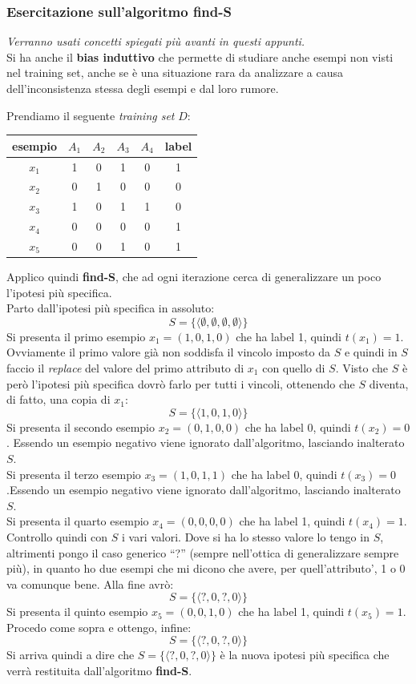 \documentclass[a4paper,12pt, oneside]{book}
\begin{document}
\subsubsection{Esercitazione sull'algoritmo find-S}
\textit{Verranno usati concetti spiegati più avanti in questi appunti.}\\
Si ha anche il \textbf{bias induttivo} che permette di studiare anche esempi non
visti nel training set, anche se è una situazione rara da analizzare a causa
dell'inconsistenza stessa degli esempi e dal loro rumore.
\begin{esempio}
  Prendiamo il seguente \textit{training set} $D$:
  \begin{table}[H]
    \centering
    \begin{tabular}[H]{c|cccc|c}
      esempio & $A_1$  & $A_2$  & $A_3$  & $A_4$ & label\\
      \hline
      $x_1$ & 1 & 0 & 1 & 0 & 1\\
      $x_2$ & 0 & 1 & 0 & 0 & 0\\
      $x_3$ & 1 & 0 & 1 & 1 & 0\\
      $x_4$ & 0 & 0 & 0 & 0 & 1\\
      $x_5$ & 0 & 0 & 1 & 0 & 1\\
    \end{tabular}
  \end{table}
  Applico quindi \textbf{find-S}, che ad ogni iterazione cerca di generalizzare
  un poco l'ipotesi più specifica.\\
  Parto dall'ipotesi più specifica in assoluto:
  \[S=\{\langle\emptyset,\emptyset,\emptyset,\emptyset\rangle\}\]
  Si presenta il primo esempio $x_1=(1,0,1,0)$ che ha label 1, quindi
  $t(x_1)=1$. Ovviamente il primo valore già non soddisfa il vincolo imposto da
  $S$ e quindi in $S$ faccio il \textit{replace} del valore del primo attributo
  di $x_1$ con quello di $S$. Visto che $S$ è però l'ipotesi più specifica dovrò
  farlo per tutti i vincoli, ottenendo che $S$ diventa, di fatto, una copia di
  $x_1$: 
  \[S=\{\langle 1,0,1,0\rangle\}\]
  Si presenta il secondo esempio $x_2=(0,1,0,0)$ che ha label 0, quindi
  $t(x_2)=0$. Essendo un esempio negativo viene ignorato dall'algoritmo,
  lasciando inalterato $S$.\\
  Si presenta il terzo esempio $x_3=(1,0,1,1)$ che ha label 0, quindi
  $t(x_3)=0$.Essendo un esempio negativo viene ignorato dall'algoritmo,
  lasciando inalterato $S$.\\
  Si presenta il quarto esempio $x_4=(0,0,0,0)$ che ha label 1, quindi
  $t(x_4)=1$. Controllo quindi con $S$ i vari valori. Dove si ha lo stesso
  valore lo tengo in $S$, altrimenti pongo il caso generico ``?'' (sempre
  nell'ottica di generalizzare sempre più), in quanto ho
  due esempi che mi dicono che avere, per quell'attributo', 1 o 0 va comunque
  bene. Alla fine avrò:
  \[S=\{\langle ?,0,?,0\rangle\}\]
  Si presenta il quinto esempio $x_5=(0,0,1,0)$ che ha label 1, quindi
  $t(x_5)=1$. Procedo come sopra e ottengo, infine:
  \[S=\{\langle ?,0,?,0\rangle\}\]
  Si arriva quindi a dire che $S=\{\langle ?,0,?,0\rangle\}$ è la nuova ipotesi
  più specifica che verrà restituita dall'algoritmo \textbf{find-S}.
\end{esempio}
\end{document}

